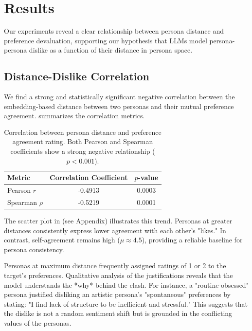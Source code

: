 \section{Results}

Our experiments reveal a clear relationship between persona distance and preference devaluation, supporting our hypothesis that LLMs model persona-persona dislike as a function of their distance in persona space.

\subsection{Distance-Dislike Correlation}

We find a strong and statistically significant negative correlation between the embedding-based distance between two personas and their mutual preference agreement.  summarizes the correlation metrics.

\begin{table}[h]
\centering
\caption{Correlation between persona distance and preference agreement rating. Both Pearson and Spearman coefficients show a strong negative relationship ($p < 0.001$).}
\begin{tabular}{@{}lcc@{}}
\toprule
Metric & Correlation Coefficient & $p$-value \\
\midrule
Pearson $r$ & -0.4913 & 0.0003 \\
Spearman $\rho$ & -0.5219 & 0.0001 \\
\bottomrule
\end{tabular}
\label{tab:correlation}
\end{table}

The scatter plot in  (see Appendix) illustrates this trend. Personas at greater distances consistently express lower agreement with each other's "likes." In contrast, self-agreement remains high ($\mu \approx 4.5$), providing a reliable baseline for persona consistency.

 Personas at maximum distance frequently assigned ratings of 1 or 2 to the target's preferences. Qualitative analysis of the justifications reveals that the model understands the *why* behind the clash. For instance, a "routine-obsessed" persona justified disliking an artistic persona's "spontaneous" preferences by stating: "I find lack of structure to be inefficient and stressful." This suggests that the dislike is not a random sentiment shift but is grounded in the conflicting values of the personas.

